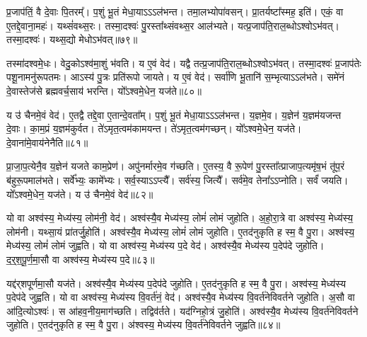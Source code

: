 प्र॒जा\-प॑तिं॒ वै दे॒वाः पि॒तरम्᳚।
प॒शुं भू॒तं मेधा॒याऽऽऽल॑भन्त।
तमा॒लभ्योपा॑वसन्।
प्रा॒तर्यष्टा᳚स्मह॒ इति॑।
एकं॒ वा ए॒तद्दे॒वाना॒महः॑।
यथ्सं॑वथ्स॒रः।
तस्मा॒दश्वः॑ पु॒रस्ता᳚थ्संवथ्स॒र आल॑भ्यते।
यत्प्र॒जा\-प॑ति॒\-रा\-ल॒ब्धो\-ऽश्वो\-ऽभ॑वत्।
तस्मा॒दश्वः॑।
यथ्स॒द्यो मेधो\-ऽभ॑वत्॥७९॥

तस्मा॑दश्वमे॒धः।
वेदु॒को\-ऽश्व॑मा॒शुं भ॑वति।
य ए॒वं वेद॑।
यद्वै तत्प्र॒जा\-प॑ति॒राल॒ब्धो\-ऽश्वो\-ऽभ॑वत्।
तस्मा॒दश्वः॑ प्र॒जा\-प॑तेः पशू॒नामनु॑रूपतमः।
आऽस्य॑ पु॒त्रः प्रति॑\-रूपो जायते।
य ए॒वं वेद॑।
सर्वा॑णि भू॒तानि॑ स॒म्भृत्याऽऽल॑भते।
समे॑नं दे॒वास्तेज॑से ब्रह्मवर्च॒साय॑ भरन्ति।
यो᳚ऽश्वमे॒धेन॒ यज॑ते॥८०॥

य उ॑ चैनमे॒वं वेद॑।
ए॒तद्वै तद्दे॒वा ए॒तान्दे॒वता᳚म्।
प॒शुं भू॒तं मेधा॒याऽऽऽल॑भन्त।
य॒ज्ञमे॒व।
य॒ज्ञेन॑ य॒ज्ञम॑यजन्त दे॒वाः।
का॒म॒प्रं य॒ज्ञम॑कुर्वत।
ते॑ऽमृत॒त्वम॑कामयन्त।
ते॑ऽमृत॒त्वम॑गच्छन्।
यो᳚ऽश्वमे॒धेन॒ यज॑ते।
दे॒वाना॑मे॒वाय॑नेनैति॥८१॥

प्रा॒जा॒प॒त्येनै॒व य॒ज्ञेन॑ यजते काम॒प्रेण॑।
अपु॑नर्मारमे॒व ग॑च्छति।
ए॒तस्य॒ वै रू॒पेण॑ पु॒रस्ता᳚त्प्राजाप॒त्यमृ॑ष॒भं तू॑प॒रं ब॑हुरू॒पमाल॑भते।
सर्वे᳚भ्यः॒ कामे᳚भ्यः।
सर्व॒स्याऽऽप्त्यै᳚।
सर्व॑स्य॒ जित्यै᳚।
सर्व॑मे॒व तेना᳚\-ऽऽ\-प्नोति।
सर्वं॑ जयति।
यो᳚ऽश्वमे॒धेन॒ यज॑ते।
य उ॑ चैनमे॒वं वेद॑॥८२॥\anuvakamend[मेधो\-ऽभ॑व॒द्यज॑त एति॒ वेद॑]

यो वा अश्व॑स्य॒ मेध्य॑स्य॒ लोम॑नी॒ वेद॑।
अश्व॑स्यै॒व मेध्य॑स्य॒ लोमं॑ लोमं जुहोति।
अ॒हो॒रा॒त्रे वा अश्व॑स्य॒ मेध्य॑स्य॒ लोम॑नी।
यथ्सा॒यं प्रा॑तर्जु॒होति॑।
अश्व॑स्यै॒व मेध्य॑स्य॒ लोमं॑ लोमं जुहोति।
ए॒तद॑नुकृति ह स्म॒ वै पु॒रा।
अश्व॑स्य॒ मेध्य॑स्य॒ लोमं॑ लोमं जुह्वति।
यो वा अश्व॑स्य॒ मेध्य॑स्य प॒दे वेद॑।
अश्व॑स्यै॒व मेध्य॑स्य प॒देप॑दे जुहोति।
द॒र्॒श॒पू॒र्ण॒मा॒सौ वा अश्व॑स्य॒ मेध्य॑स्य प॒दे॥८३॥

यद्द॑र्‌\mbox{}शपूर्णमा॒सौ यज॑ते।
अश्व॑स्यै॒व मेध्य॑स्य प॒देप॑दे जुहोति।
ए॒तद॑नुकृति ह स्म॒ वै पु॒रा।
अश्व॑स्य॒ मेध्य॑स्य प॒देप॑दे जुह्वति।
यो वा अश्व॑स्य॒ मेध्य॑स्य वि॒वर्त॑नं॒ वेद॑।
अश्व॑स्यै॒व मेध्य॑स्य वि॒वर्त॑नेविवर्तने जुहोति।
अ॒सौ वा आ॑दि॒त्यो\-ऽश्वः॑।
स आ॑हव॒नीय॒माग॑च्छति।
तद्विव॑र्तते।
यद॑ग्निहो॒त्रं जु॒होति॑।
अश्व॑स्यै॒व मेध्य॑स्य वि॒वर्त॑नेविवर्तने जुहोति।
ए॒तद॑नुकृति ह स्म॒ वै पु॒रा।
अ॑श्वस्य॒ मेध्य॑स्य वि॒वर्त॑नेविवर्तने जुह्वति॥८४॥\anuvakamend[प॒दे अ॑ग्निहो॒त्रं जु॒होति॒ त्रीणि॑ च]

\clearpage
